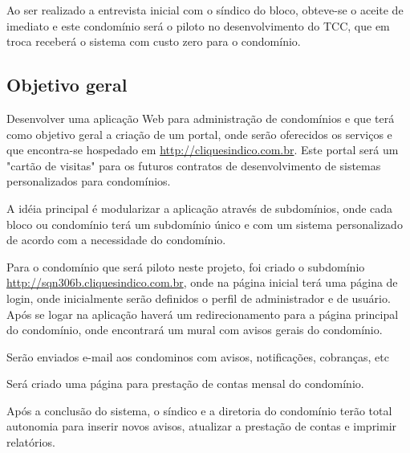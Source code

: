 Ao ser realizado a entrevista inicial com o síndico do bloco, obteve-se o
aceite de imediato e este condomínio será o piloto no desenvolvimento
do TCC, que em troca receberá o sistema com custo zero para o condomínio.

\subsection{Objetivo geral}
Desenvolver uma aplicação Web para administração de condomínios e que
terá como objetivo geral a criação de um portal, onde serão oferecidos
os serviços e que encontra-se hospedado em \url{http://cliquesindico.com.br}.
Este portal será um "cartão de visitas" para os futuros contratos de
desenvolvimento de sistemas personalizados para condomínios.

A idéia principal é modularizar a aplicação através de subdomínios, onde cada 
bloco ou condomínio terá um subdomínio único e com um sistema personalizado
de acordo com a necessidade do condomínio.

Para o condomínio que será piloto neste projeto, foi criado o subdomínio
\url{http://sqn306b.cliquesindico.com.br}, onde na página inicial terá uma página
de login, onde inicialmente serão definidos o perfil de administrador e de usuário.
Após se logar na aplicação haverá um redirecionamento para a página
principal do condomínio, onde encontrará um mural com avisos gerais do condomínio.

Serão enviados e-mail aos condominos com avisos, notificações, cobranças, etc

Será criado uma página para prestação de contas mensal do condomínio.

Após a conclusão do sistema, o síndico e a diretoria do condomínio terão total
autonomia para inserir novos avisos, atualizar a prestação de contas e imprimir
relatórios.

